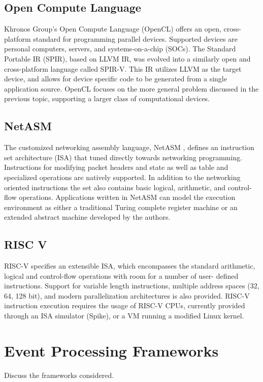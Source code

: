 \subsection{Open Compute Language}
\label{related:ocl}
Khronos Group's Open Compute Language (OpenCL) \cite{opencl} offers an open,
cross-platform standard for programming parallel devices. Supported devices are
personal computers, servers, and systems-on-a-chip (SOCs). The Standard
Portable IR (SPIR), based on LLVM IR, was evolved into a similarly open and
cross-platform language called SPIR-V. This IR utilizes LLVM as the target
device, and allows for device specific code to be generated from a single
application source. OpenCL focuses on the more general problem discussed in
the previous topic, supporting a larger class of computational devices.

\subsection{NetASM}
\label{related:netasm}
The customized networking assembly language, NetASM \cite{netasm}, defines an
instruction set architecture (ISA) that tuned directly towards networking
programming. Instructions for modifying packet headers and state as well
as table and specialized operations are natively supported. In addition to the
networking oriented instructions the set also contains basic logical,
arithmetic, and control-flow operations. Applications written in NetASM can
model the execution environment as either a traditional Turing complete
register machine or an extended abstract machine developed by the authors.

\subsection{RISC V}
\label{related:riscv}
RISC-V \cite{riscv} specifies an extensible ISA, which encompasses the standard
arithmetic, logical and control-flow operations with room for a number of user-
defined instructions. Support for variable length instructions, multiple
address spaces (32, 64, 128 bit), and modern parallelization architectures is
also provided. RISC-V instruction execution requires the usage of RISC-V CPUs,
currently provided through an ISA simulator (Spike), or a VM running a modified
Linux kernel.

\section{Event Processing Frameworks}
\label{related:event}
Discuss the frameworks considered.

